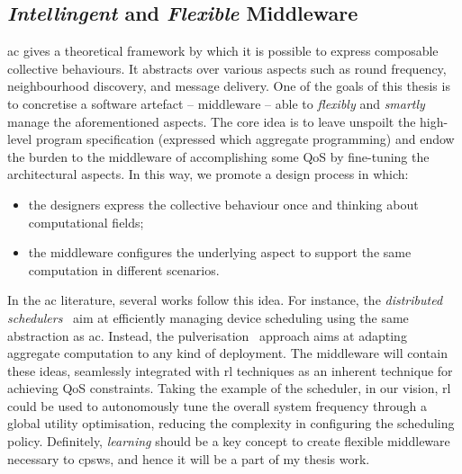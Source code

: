 \documentclass[11pt]{article}
\begin{document}
\subsection{\emph{Intellingent} and \emph{Flexible} Middleware}\label{middleware}
\ac{ac} gives a theoretical framework by which it is possible to express composable collective behaviours. It abstracts over various aspects such as round frequency, neighbourhood discovery, and message delivery.
One of the goals of this thesis is to concretise a software artefact -- middleware -- able to \emph{flexibly} and \emph{smartly} manage the aforementioned aspects.
%
The core idea is to leave unspoilt the high-level program specification (expressed which aggregate programming) and endow the burden to the middleware of accomplishing some QoS by fine-tuning the architectural aspects. 
%
In this way, we promote a design process in which:
\begin{itemize}
	\item the designers express the collective behaviour once and thinking about computational fields;
	\item the middleware configures the underlying aspect to support the same computation in different scenarios.
\end{itemize}
%
In the \ac{ac} literature, several works follow this idea. 
%
For instance, the \emph{distributed schedulers}~\cite{DBLP:journals/corr/abs-2012-13806} aim at efficiently managing device scheduling using the same abstraction as \ac{ac}.
Instead, the pulverisation~\cite{DBLP:journals/fi/CasadeiPPVW20} approach aims at adapting aggregate computation to any kind of deployment.
%
The middleware will contain these ideas, seamlessly integrated with \ac{rl} techniques as an inherent technique for achieving  QoS constraints.
%
Taking the example of the scheduler, in our vision, \ac{rl} could be used to autonomously tune the overall system frequency through a global utility optimisation, reducing the complexity in configuring the scheduling policy.
%
Definitely, \emph{learning} should be a key concept to create flexible middleware necessary to \acp{cpsw}, and hence it will be a part of my thesis work. 



\end{document}
